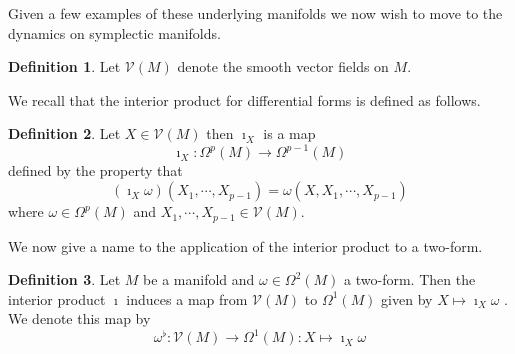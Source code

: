 \documentclass[psamsfonts,12pt]{amsart}
\newcommand\td{\mathrm{d}}
\newcommand\0{\mathbf{0}}
\theoremstyle{plain}
\newtheorem{thm}{Theorem}[section] %
\theoremstyle{definition}
\newtheorem{dfn}[thm]{Definition} %
\newcommand{\sU}{\mathcal{U}}
\newcommand{\sV}{\mathcal{V}}
\begin{document}



Given a few examples of these underlying manifolds we now wish to move to the dynamics on symplectic manifolds.

\begin{dfn}
Let $\sV(M)$ denote the smooth vector fields on $M$.
\end{dfn}

We recall that the interior product for differential forms is defined as follows.

\begin{dfn}
Let $X\in \sV(M)$ then $\imath_X$ is a map
\[
\imath_X \colon \Omega^p(M)\rightarrow \Omega^{p-1}(M)
\]
defined by the property that
\[
(\imath_X \omega)(X_1,\cdots, X_{p-1})= \omega(X, X_1, \cdots, X_{p-1})
\]
where $\omega\in \Omega^p(M)$ and $X_1,\cdots, X_{p-1}\in \sV(M)$.
\end{dfn}

We now give a name to the application of the interior product to a two-form.

\begin{dfn}
Let $M$ be a manifold and $\omega \in \Omega^2(M)$ a two-form.  Then the interior product $\imath$ induces a map from $\sV(M)$ to $\Omega^1(M)$ given by $X \mapsto \imath_X \omega$ .  We denote this map by
\[
\omega^{\flat} \colon \sV(M) \rightarrow \Omega^1(M) \colon X\mapsto \imath_X \omega
\]
\end{dfn}
\end{document}
